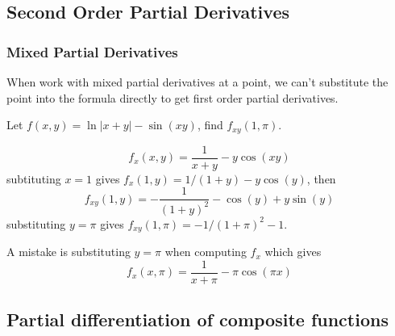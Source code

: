 \documentclass[a4]{overview}
\begin{document}
\subsection{Second Order Partial Derivatives}

\subsubsection{Mixed Partial Derivatives}

When work with mixed partial derivatives at a point, we can't substitute the point
into the formula directly to get first order partial derivatives.

\begin{example}
	Let $f(x, y)=\ln |x+y|-\sin(xy)$, find $f_{xy}(1,\pi)$.

	\begin{answer}
		\[
			f_x(x, y) = \frac{1}{x+y} - y\cos(xy)
		\]
		subtituting $x=1$ gives  $f_x(1, y) = {1}/{(1+y)} - y\cos(y)$, then
		\[
			f_{xy}(1, y) = -\frac{1}{(1+y)^2} - \cos(y) + y\sin(y)
		\]
		substituting $y=\pi$ gives $f_{xy}(1, \pi) = -1 / (1+\pi)^2 -1$.

		
	\end{answer}
	
	\begin{remark}
		A mistake is substituting $y=\pi$ when computing $f_x$ which gives
		\[
			f_x(x, \pi) = \frac{1}{x+\pi} - \pi\cos(\pi x)
		\]
	\end{remark}

\end{example}


\subsection{Partial differentiation of composite functions}
\end{document}
